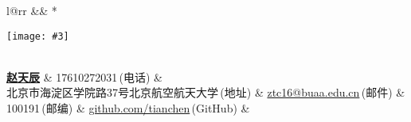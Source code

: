 \newcommand{\paint}[3]{
    \begin{minipage}{#1}
        \texttt{[image: \#3]}
    \end{minipage} 
}
\newcommand{\myheader}{
\begin{tabular*}{\textwidth}{l@{\extracolsep{\fill}}rr}
  && \multirow{4}*{\paint{2.2cm}{3.2cm}{./img.jpg}}\\
  \specialrule{0em}{4pt}{4pt}
  \textbf{\href{http://a-suozhang.xyz}{\LARGE 赵天辰}} & 17610272031$\,${\color{labelgrey}(电话)} &\\
  北京市海淀区学院路37号北京航空航天大学$\,${\color{labelgrey}(地址)} & \href{mailto:ztc16@buaa.edu.cn}{ztc16@buaa.edu.cn}$\,${\color{labelgrey}(邮件)} & \\
  100191$\,${\color{labelgrey}(邮编)} & \href{https://github.com/A-suozhang}{github.com/tianchen}$\,${\color{labelgrey}(GitHub)} & \\
  \end{tabular*}\\\vspace{0.1in}
}

\myheader

